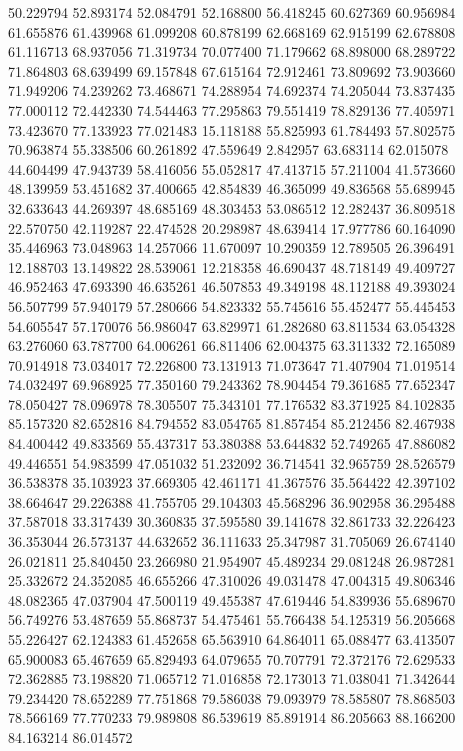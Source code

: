 50.229794
52.893174
52.084791
52.168800
56.418245
60.627369
60.956984
61.655876
61.439968
61.099208
60.878199
62.668169
62.915199
62.678808
61.116713
68.937056
71.319734
70.077400
71.179662
68.898000
68.289722
71.864803
68.639499
69.157848
67.615164
72.912461
73.809692
73.903660
71.949206
74.239262
73.468671
74.288954
74.692374
74.205044
73.837435
77.000112
72.442330
74.544463
77.295863
79.551419
78.829136
77.405971
73.423670
77.133923
77.021483
15.118188
55.825993
61.784493
57.802575
70.963874
55.338506
60.261892
47.559649
2.842957
63.683114
62.015078
44.604499
47.943739
58.416056
55.052817
47.413715
57.211004
41.573660
48.139959
53.451682
37.400665
42.854839
46.365099
49.836568
55.689945
32.633643
44.269397
48.685169
48.303453
53.086512
12.282437
36.809518
22.570750
42.119287
22.474528
20.298987
48.639414
17.977786
60.164090
35.446963
73.048963
14.257066
11.670097
10.290359
12.789505
26.396491
12.188703
13.149822
28.539061
12.218358
46.690437
48.718149
49.409727
46.952463
47.693390
46.635261
46.507853
49.349198
48.112188
49.393024
56.507799
57.940179
57.280666
54.823332
55.745616
55.452477
55.445453
54.605547
57.170076
56.986047
63.829971
61.282680
63.811534
63.054328
63.276060
63.787700
64.006261
66.811406
62.004375
63.311332
72.165089
70.914918
73.034017
72.226800
73.131913
71.073647
71.407904
71.019514
74.032497
69.968925
77.350160
79.243362
78.904454
79.361685
77.652347
78.050427
78.096978
78.305507
75.343101
77.176532
83.371925
84.102835
85.157320
82.652816
84.794552
83.054765
81.857454
85.212456
82.467938
84.400442
49.833569
55.437317
53.380388
53.644832
52.749265
47.886082
49.446551
54.983599
47.051032
51.232092
36.714541
32.965759
28.526579
36.538378
35.103923
37.669305
42.461171
41.367576
35.564422
42.397102
38.664647
29.226388
41.755705
29.104303
45.568296
36.902958
36.295488
37.587018
33.317439
30.360835
37.595580
39.141678
32.861733
32.226423
36.353044
26.573137
44.632652
36.111633
25.347987
31.705069
26.674140
26.021811
25.840450
23.266980
21.954907
45.489234
29.081248
26.987281
25.332672
24.352085
46.655266
47.310026
49.031478
47.004315
49.806346
48.082365
47.037904
47.500119
49.455387
47.619446
54.839936
55.689670
56.749276
53.487659
55.868737
54.475461
55.766438
54.125319
56.205668
55.226427
62.124383
61.452658
65.563910
64.864011
65.088477
63.413507
65.900083
65.467659
65.829493
64.079655
70.707791
72.372176
72.629533
72.362885
73.198820
71.065712
71.016858
72.173013
71.038041
71.342644
79.234420
78.652289
77.751868
79.586038
79.093979
78.585807
78.868503
78.566169
77.770233
79.989808
86.539619
85.891914
86.205663
88.166200
84.163214
86.014572
